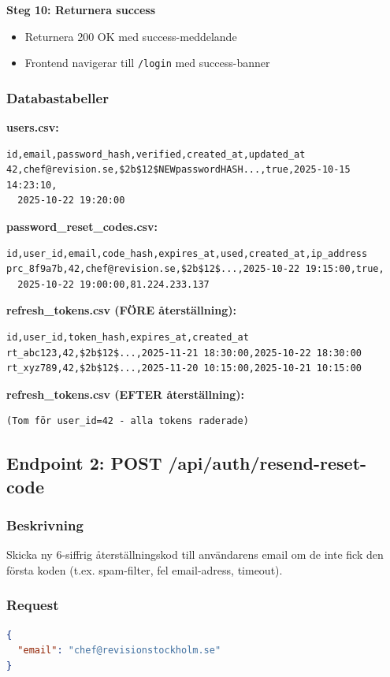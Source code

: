 \documentclass[12pt,a4paper]{article}
\begin{document}
\textbf{Steg 10: Returnera success}
\begin{itemize}[noitemsep]
  \item Returnera 200 OK med success-meddelande
  \item Frontend navigerar till \texttt{/login} med success-banner
\end{itemize}

\subsubsection{Databastabeller}

\textbf{users.csv:}
\begin{verbatim}
id,email,password_hash,verified,created_at,updated_at
42,chef@revision.se,$2b$12$NEWpasswordHASH...,true,2025-10-15 14:23:10,
  2025-10-22 19:20:00
\end{verbatim}

\textbf{password\_reset\_codes.csv:}
\begin{verbatim}
id,user_id,email,code_hash,expires_at,used,created_at,ip_address
prc_8f9a7b,42,chef@revision.se,$2b$12$...,2025-10-22 19:15:00,true,
  2025-10-22 19:00:00,81.224.233.137
\end{verbatim}

\textbf{refresh\_tokens.csv (FÖRE återställning):}
\begin{verbatim}
id,user_id,token_hash,expires_at,created_at
rt_abc123,42,$2b$12$...,2025-11-21 18:30:00,2025-10-22 18:30:00
rt_xyz789,42,$2b$12$...,2025-11-20 10:15:00,2025-10-21 10:15:00
\end{verbatim}

\textbf{refresh\_tokens.csv (EFTER återställning):}
\begin{verbatim}
(Tom för user_id=42 - alla tokens raderade)
\end{verbatim}

\subsection{Endpoint 2: POST /api/auth/resend-reset-code}

\subsubsection{Beskrivning}
Skicka ny 6-siffrig återställningskod till användarens email om de inte fick den första koden (t.ex. spam-filter, fel email-adress, timeout).

\subsubsection{Request}
\begin{lstlisting}[language=json]
{
  "email": "chef@revisionstockholm.se"
}
\end{lstlisting}
\end{document}
